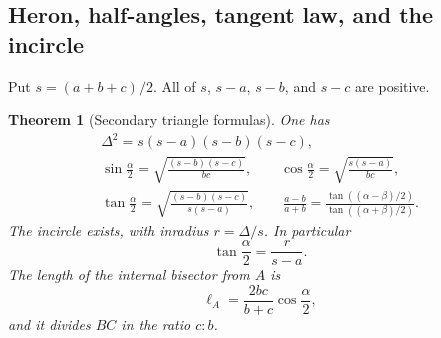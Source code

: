 \documentclass[11pt,letterpaper]{article}
\newtheorem{theorem}{Theorem}[section]
\theoremstyle{definition}
\theoremstyle{remark}
\numberwithin{equation}{section}
\begin{document}
\subsection{Heron, half-angles, tangent law, and the incircle}
Put $s=(a+b+c)/2$. All of $s$, $s-a$, $s-b$, and $s-c$ are positive.
\begin{theorem}[Secondary triangle formulas]\label{thm:secondary}
One has
\begin{gather}
 \Delta^2=s(s-a)(s-b)(s-c),\label{eq:heron}\\
 \sin\frac\alpha2=\sqrt{\frac{(s-b)(s-c)}{bc}},\qquad
 \cos\frac\alpha2=\sqrt{\frac{s(s-a)}{bc}},\label{eq:halfangles}\\
 \tan\frac\alpha2=\sqrt{\frac{(s-b)(s-c)}{s(s-a)}},\qquad
 \frac{a-b}{a+b}
 =\frac{\tan((\alpha-\beta)/2)}{\tan((\alpha+\beta)/2)}.\label{eq:tangentlaw}
\end{gather}
The incircle exists, with inradius $r=\Delta/s$. In particular
\begin{equation}\label{eq:inhalf}
 \tan\frac\alpha2=\frac{r}{s-a}.
\end{equation}
The length of the internal bisector from $A$ is
\begin{equation}\label{eq:bisector}
 \ell_A=\frac{2bc}{b+c}\cos\frac\alpha2,
\end{equation}
and it divides $BC$ in the ratio $c:b$.
\end{theorem}
\end{document}
